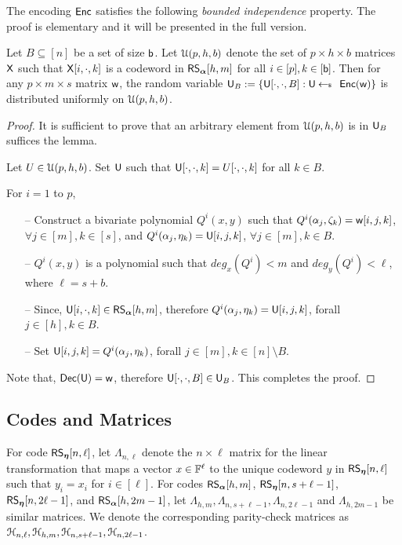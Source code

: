 The encoding $\enc$ satisfies the following {\em bounded independence} property. The proof is elementary and it will be presented in the full version.%
\begin{lemma}\label{lem:boundedindependence}
	Let $B\subseteq [n]$ be a set of size $\bi$. Let $\mc{U}(p,h,b)$ denote the set of $p\times h\times b$ matrices $\matx$ such that $\matx[i,\cdot,k]$ is a codeword in $\rsc{\alpha}{h,m}$ for all $i\in [p],k\in [\bi]$. Then for any $p\times m\times s$ matrix $\wit$, the random variable $\ewit_B := \{\ewit[\cdot,\cdot,B]: \ewit\sample \enc(\wit)\}$ is distributed uniformly on $\mc{U}(p,h,b)$.
\end{lemma}

\begin{proof}
	It is sufficient to prove that an arbitrary element from $\mc{U}(p,h,b)$ is in $\ewit_B$ suffices the lemma.
	
	Let $U\in\mc{U}(p,h,b)$. Set $\ewit$ such that $\ewit[\cdot, \cdot, k] = U[\cdot, \cdot, k]$ for all $k\in B$.
	
	For $i=1$ to $p$,
	\begin{itemize}
		\item[--] Construct a bivariate polynomial $Q^i(x,y)$ such that $Q^i(\alpha_j, \zeta_k) = \wit[i,j,k]$, $\forall j\in[m], k\in[s]$, and $Q^i(\alpha_j, \eta_k) = \ewit[i,j,k]$, $\forall j\in[m], k\in B$. 
		\item[--] $Q^i(x,y)$ is a polynomial such that $deg_x(Q^i) < m$ and $deg_y(Q^i) < \ell$, where $\ell = s + b$.
		\item[--] Since, $\ewit[i,\cdot,k] \in \rsc{\alpha}{h,m}$, therefore $Q^i(\alpha_j,\eta_k) = \ewit[i,j,k]$, forall $j\in[h], k\in B$.
		\item[--] Set $\ewit[i,j,k] = Q^i(\alpha_j, \eta_k)$, forall $j\in[m], k\in [n]\setminus B$. 
	\end{itemize}
	Note that, $\dec(\ewit) = \wit$, therefore $\ewit[\cdot, \cdot, B]\in \ewit_B$.
	This completes the proof.
\end{proof}

\subsection{Codes and Matrices}\label{subsec:codesandmatrices}
For code $\rsc{\eta}{n,\ell}$, let $\Lambda_{n,\ell}$ denote the $n\times \ell$ matrix for the linear transformation that maps a vector $x\in \FF^\ell$ to the unique codeword $y$ in  $\rsc{\eta}{n,\ell}$ such that $y_i=x_i$ for $i\in [\ell]$. For codes  $\rsc{\alpha}{h,m}$, $\rsc{\eta}{n,s+\ell-1}$, $\rsc{\eta}{n,2\ell-1}$, and $\rsc{\alpha}{h,2m-1}$, let
$\Lambda_{h,m},\Lambda_{n,s+\ell-1},\Lambda_{n,2\ell-1}$ and $\Lambda_{h,2m-1}$ be similar matrices. We denote the corresponding parity-check matrices as $\mc{H}_{n,\ell},\mc{H}_{h,m},\mc{H}_{n,s+\ell-1},\mc{H}_{n,2\ell-1}$. 

